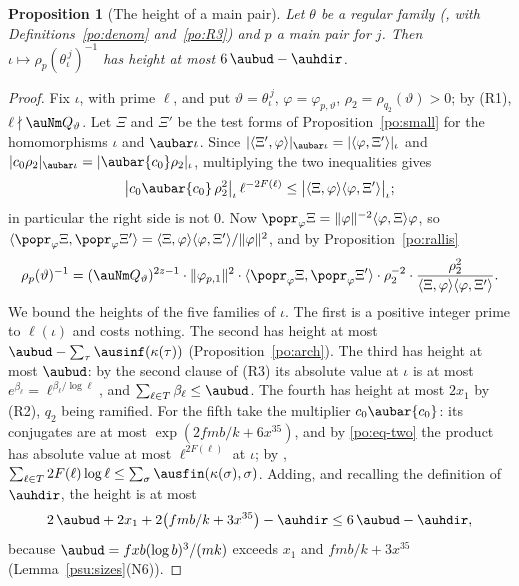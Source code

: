 \documentclass[10pt]{amsart}
\newtheorem{proposition}[theorem]{Proposition}
\theoremstyle{definition}
\theoremstyle{remark}
\begin{document}
\begin{proposition}[The height of a main pair]\label{po:mainheight}
Let $\theta$ be a regular
family ({\cite[Definition~14.39]{P46}}, with Definitions~\ref{po:denom} and~\ref{po:R3}) and $p$
a main pair for $j$. Then $\iota\mapsto\rho_p(\theta_\iota^{\,j})^{-1}$ has height at most
$6\,\aubud-\auhdir$.
\end{proposition}
\begin{proof}
Fix $\iota$, with prime $\ell$, and put $\vartheta=\theta_\iota^{\,j}$, $\varphi=\varphi_{p,
\vartheta}$, $\rho_2=\rho_{q_2}(\vartheta)>0$; by (R1), $\ell\nmid\auNm Q_\vartheta$. Let $\Xi$
and $\Xi'$ be the test forms of Proposition~\ref{po:small} for the homomorphisms $\iota$ and
$\aubar\iota$. Since $|\langle\Xi',\varphi\rangle|_{\aubar\iota}=|\langle\varphi,\Xi'\rangle|_\iota$
and $|c_0\rho_2|_{\aubar\iota}=|\aubar{c_0}\rho_2|_\iota$, multiplying the two inequalities gives
\begin{equation}\label{po:eq-two}
\bigl|c_0\aubar{c_0}\,\rho_2^2\bigr|_\iota\,\ell^{-2F(\ell)}\le\bigl|\langle\Xi,\varphi\rangle
\langle\varphi,\Xi'\rangle\bigr|_\iota ;
\end{equation}
in particular the right side is not $0$. Now $\popr_\varphi\Xi=\|\varphi\|^{-2}\langle\varphi,\Xi
\rangle\varphi$, so $\langle\popr_\varphi\Xi,\popr_\varphi\Xi'\rangle=\langle\Xi,\varphi\rangle
\langle\varphi,\Xi'\rangle/\|\varphi\|^2$, and by Proposition~\ref{po:rallis}
\[
\rho_p(\vartheta)^{-1}=(\auNm Q_\vartheta)^{2z-1}\cdot\|\varphi_{p,1}\|^2\cdot\langle\popr_\varphi
\Xi,\popr_\varphi\Xi'\rangle\cdot\rho_2^{-2}\cdot\frac{\rho_2^2}{\langle\Xi,\varphi\rangle\langle
\varphi,\Xi'\rangle} .
\]
We bound the heights of the five families of $\iota$. The first is a positive integer prime to
$\ell(\iota)$ and costs nothing. The second has height at most $\aubud-\sum_\tau\ausinf(\kappa
(\tau))$ (Proposition~\ref{po:arch}). The third has height at most $\aubud$: by the second clause
of (R3) its absolute value at $\iota$ is at most $e^{\beta_\ell}=\ell^{\beta_\ell/\log\ell}$, and
$\sum_{\ell\in T}\beta_\ell\le\aubud$. The fourth has height at most $2x_1$ by (R2), $q_2$ being
ramified. For the fifth take the multiplier $c_0\aubar{c_0}$: its conjugates are at most
$\exp(2fmb/k+6x^{35})$, and by \eqref{po:eq-two} the product has absolute value at most
$\ell^{2F(\ell)}$ at $\iota$; by {\cite[Lemma~14.9(a)]{P46}}, $\sum_{\ell\in T}2F(\ell)\log\ell\le
\sum_\sigma\ausfin(\kappa(\sigma),\sigma)$. Adding, and recalling the definition of $\auhdir$, the
height is at most
\[
2\,\aubud+2x_1+2\bigl(fmb/k+3x^{35}\bigr)-\auhdir\le6\,\aubud-\auhdir ,
\]
because $\aubud=fxb(\log b)^3/(mk)$ exceeds $x_1$ and $fmb/k+3x^{35}$ (Lemma~\ref{psu:sizes}(N6)).
\end{proof}
\end{document}
